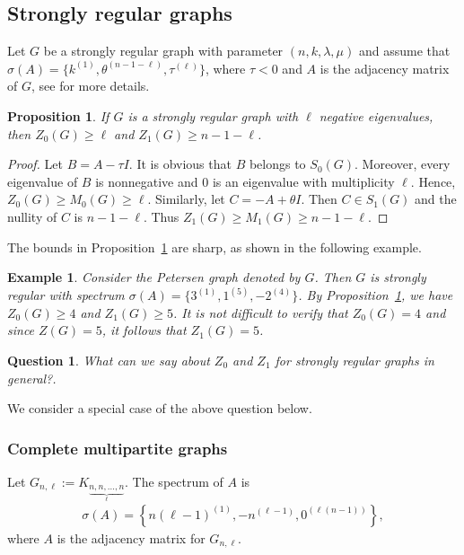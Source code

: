 \documentclass[3p,times,12pt]{article}
\newtheorem{prop}[theorem]{Proposition}
\newtheorem{exam}[theorem]{Example}
\newtheorem{question}[theorem]{Question}
\begin{document}
	\subsection{Strongly regular graphs}
	Let $G$ be a strongly regular graph with parameter $(n,k,\lambda,\mu)$ and assume that $\sigma(A) = \{ k^{(1)}, \theta^{(n-1-\ell)}, \tau^{(\ell)} \}$, where $\tau <0$ and $A$ is the adjacency matrix of $G$, see \cite{GM} for more details.
	\begin{prop} If $G$ is a strongly regular graph with $\ell$ negative eigenvalues, then
		$Z_0(G) \geq \ell$ and $Z_1(G)\geq n-1-\ell$.\label{lem:lower-bound-srg}
	\end{prop}

	\begin{proof}
		Let $B = A-\tau I  $. It is obvious that $B$ belongs to $S_0(G)$. Moreover, every eigenvalue of $B$ is nonnegative and $0$ is an eigenvalue with multiplicity $\ell$. Hence, $Z_0(G) \geq M_0(G) \geq \ell$. Similarly, let $C=-A+\theta I$. Then $C \in S_{1}(G)$ and the nullity of $C$ is $n-1-\ell.$ Thus $Z_1(G) \geq M_1(G) \geq n-1-\ell$.
	\end{proof}
	
	The bounds in Proposition~\ref{lem:lower-bound-srg} are sharp, as shown in the following example.
	\begin{exam}
		Consider the Petersen graph denoted by $G$. Then $G$ is strongly regular with spectrum $\sigma(A) = \{3^{(1)},1^{(5)},-2^{(4)}\}$. By Proposition~\ref{lem:lower-bound-srg}, we have $Z_0(G)\geq 4$ and $Z_1(G) \geq 5$.  It is not difficult to verify that $Z_0(G) = 4$ and since $Z(G)=5$, it follows that $Z_1(G) = 5$.
	\end{exam}
	\begin{question}
		What can we say about $Z_0$ and $Z_1$ for strongly regular graphs in general?.
	\end{question}
	
	We consider a special case of the above question below.
	
	\subsubsection{Complete multipartite graphs}
	Let $G_{n,\ell} := K_{\underbrace{n,n,\ldots,n}_{\ell}}$. The spectrum of $A$ is
	\begin{align*}
	\sigma(A) = \left\{ n(\ell-1)^{(1)},-n^{(\ell-1)}, 0^{(\ell(n-1))} \right\},
	\end{align*} where $A$ is the adjacency matrix for $G_{n,\ell}$.
\end{document}

